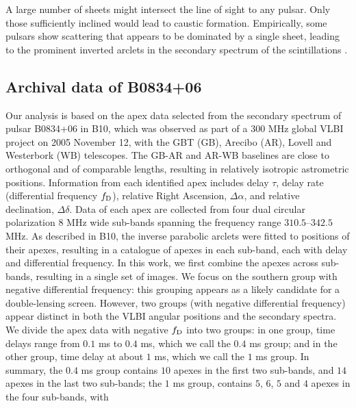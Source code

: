\documentclass[useAMS,usenatbib]{mn2e}
\begin{document}
A large number of sheets might intersect the line of sight to any
pulsar.  Only those sufficiently inclined would lead to caustic
formation.  Empirically, some pulsars show scattering that appears to be dominated by a
single sheet, leading to the prominent inverted
arclets in the secondary spectrum of the scintillations \citep{2001ApJ...549L..97S}.

\subsection{Archival data of B0834+06}
\label{21}
Our analysis is based on the apex data selected from the secondary
spectrum of pulsar B0834+06 in B10, which was
observed as part of a 300 MHz global VLBI project on 2005 November 12, with
the GBT (GB), Arecibo (AR), Lovell and Westerbork (WB) telescopes.  The GB-AR and AR-WB
baselines are close to orthogonal and of comparable lengths, resulting
in relatively isotropic astrometric positions.
Information from each identified apex includes delay $\tau$,
delay rate (differential frequency $f_{\rm D}$), relative Right Ascension,
$\Delta\alpha$, and relative declination, $\Delta\delta$.
Data of each apex are collected from four dual circular polarization $8$ MHz wide sub-bands spanning the frequency range $310.5$--$342.5$ MHz. 
As described in B10, the inverse parabolic
arclets were fitted to positions of their apexes, resulting in a
catalogue of apexes in each sub-band, each with delay and differential
frequency.  
In this work, we first combine the
apexes across sub-bands, resulting in a single set of images.  We focus on
the southern group with negative differential frequency: this
grouping appears as a likely candidate for a double-lensing screen.  However, two groups (with negative differential frequency) appear distinct in both the VLBI angular positions and the secondary spectra.  We divide the apex data with negative $f_{\rm D}$ into two
groups: in one group, time delays range from $0.1$ ms to $0.4$ ms,
which we call the $0.4$ ms group; and in the other group, time delay at
about $1$ ms, which we call the $1$ ms group.  In summary, the
$0.4$ ms group contains $10$ apexes in the first two sub-bands, and
$14$ apexes in the last two sub-bands; the $1$ ms group, contains $5$,
$6$, $5$ and $4$ apexes in the four sub-bands, with
\end{document}
